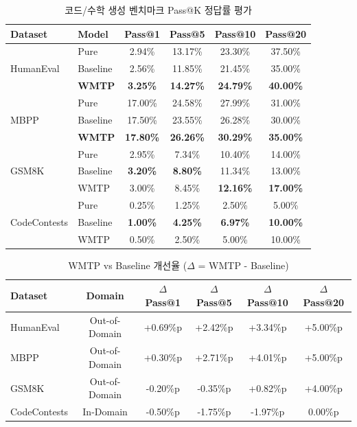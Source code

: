 \documentclass[11pt,a4paper]{article}
\begin{document}
\begin{table}[H]
\centering
\caption{코드/수학 생성 벤치마크 Pass@K 정답률 평가}
\label{tab:full_results}
\begin{tabular}{llcccc}
\toprule
\textbf{Dataset} & \textbf{Model} & \textbf{Pass@1} & \textbf{Pass@5} & \textbf{Pass@10} & \textbf{Pass@20} \\
\midrule
\multirow{3}{*}{HumanEval}
& Pure & 2.94\% & 13.17\% & 23.30\% & 37.50\% \\
& Baseline & 2.56\% & 11.85\% & 21.45\% & 35.00\% \\
& \textbf{WMTP} & \textbf{3.25\%} & \textbf{14.27\%} & \textbf{24.79\%} & \textbf{40.00\%} \\
\midrule
\multirow{3}{*}{MBPP}
& Pure & 17.00\% & 24.58\% & 27.99\% & 31.00\% \\
& Baseline & 17.50\% & 23.55\% & 26.28\% & 30.00\% \\
& \textbf{WMTP} & \textbf{17.80\%} & \textbf{26.26\%} & \textbf{30.29\%} & \textbf{35.00\%} \\
\midrule
\multirow{3}{*}{GSM8K}
& Pure & 2.95\% & 7.34\% & 10.40\% & 14.00\% \\
& Baseline & \textbf{3.20\%} & \textbf{8.80\%} & 11.34\% & 13.00\% \\
& WMTP & 3.00\% & 8.45\% & \textbf{12.16\%} & \textbf{17.00\%} \\
\midrule
\multirow{3}{*}{CodeContests}
& Pure & 0.25\% & 1.25\% & 2.50\% & 5.00\% \\
& Baseline & \textbf{1.00\%} & \textbf{4.25\%} & \textbf{6.97\%} & \textbf{10.00\%} \\
& WMTP & 0.50\% & 2.50\% & 5.00\% & 10.00\% \\
\bottomrule
\end{tabular}
\end{table}

\begin{table}[H]
\centering
\caption{WMTP vs Baseline 개선율 ($\Delta$ = WMTP - Baseline)}
\label{tab:improvement}
\begin{tabular}{lccccc}
\toprule
\textbf{Dataset} & \textbf{Domain} & \textbf{$\Delta$Pass@1} & \textbf{$\Delta$Pass@5} & \textbf{$\Delta$Pass@10} & \textbf{$\Delta$Pass@20} \\
\midrule
HumanEval & Out-of-Domain & \textcolor{green!60!black}{+0.69\%p} & \textcolor{green!60!black}{+2.42\%p} & \textcolor{green!60!black}{+3.34\%p} & \textcolor{green!60!black}{+5.00\%p} \\
MBPP & Out-of-Domain & \textcolor{green!60!black}{+0.30\%p} & \textcolor{green!60!black}{+2.71\%p} & \textcolor{green!60!black}{+4.01\%p} & \textcolor{green!60!black}{+5.00\%p} \\
GSM8K & Out-of-Domain & \textcolor{red!60!black}{-0.20\%p} & \textcolor{red!60!black}{-0.35\%p} & \textcolor{green!60!black}{+0.82\%p} & \textcolor{green!60!black}{+4.00\%p} \\
CodeContests & In-Domain & \textcolor{red!60!black}{-0.50\%p} & \textcolor{red!60!black}{-1.75\%p} & \textcolor{red!60!black}{-1.97\%p} & 0.00\%p \\
\bottomrule
\end{tabular}
\end{table}
\end{document}
